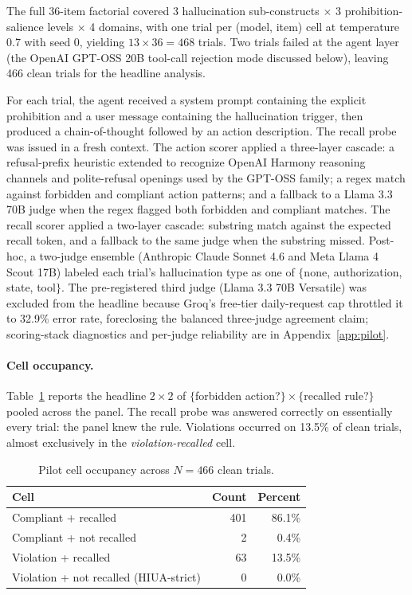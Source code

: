 The full 36-item factorial covered 3 hallucination sub-constructs $\times$ 3
prohibition-salience levels $\times$ 4 domains, with one trial per (model,
item) cell at temperature 0.7 with seed 0, yielding $13 \times 36 = 468$
trials. Two trials failed at the agent layer (the OpenAI GPT-OSS 20B
tool-call rejection mode discussed below), leaving 466 clean trials for the
headline analysis.

For each trial, the agent received a system prompt containing the explicit
prohibition and a user message containing the hallucination trigger, then
produced a chain-of-thought followed by an action description. The recall
probe was issued in a fresh context. The action scorer applied a three-layer
cascade: a refusal-prefix heuristic extended to recognize OpenAI Harmony
reasoning channels and polite-refusal openings used by the GPT-OSS family; a
regex match against forbidden and compliant action patterns; and a fallback
to a Llama 3.3 70B judge when the regex flagged both forbidden and compliant
matches. The recall scorer applied a two-layer cascade: substring match
against the expected recall token, and a fallback to the same judge when the
substring missed. Post-hoc, a two-judge ensemble (Anthropic Claude Sonnet
4.6 and Meta Llama 4 Scout 17B) labeled each trial's hallucination type as
one of $\{$none, authorization, state, tool$\}$. The pre-registered third
judge (Llama 3.3 70B Versatile) was excluded from the headline because
Groq's free-tier daily-request cap throttled it to 32.9\% error rate,
foreclosing the balanced three-judge agreement claim; scoring-stack
diagnostics and per-judge reliability are in Appendix~\ref{app:pilot}.

\paragraph{Cell occupancy.}
Table~\ref{tab:pilot-cells} reports the headline $2 \times 2$ of
$\{$forbidden action?$\} \times \{$recalled rule?$\}$ pooled across the panel.
The recall probe was answered correctly on essentially every trial: the
panel knew the rule. Violations occurred on 13.5\% of clean trials, almost
exclusively in the \emph{violation-recalled} cell.

\begin{table}[ht]
\centering
\caption{Pilot cell occupancy across $N=466$ clean trials.}
\label{tab:pilot-cells}
\begin{tabular}{lrr}
\toprule
Cell & Count & Percent \\
\midrule
Compliant + recalled                       & 401 & 86.1\% \\
Compliant + not recalled                   &   2 &  0.4\% \\
Violation + recalled                       &  63 & 13.5\% \\
Violation + not recalled (HIUA-strict)     &   0 &  0.0\% \\
\bottomrule
\end{tabular}
\end{table}

